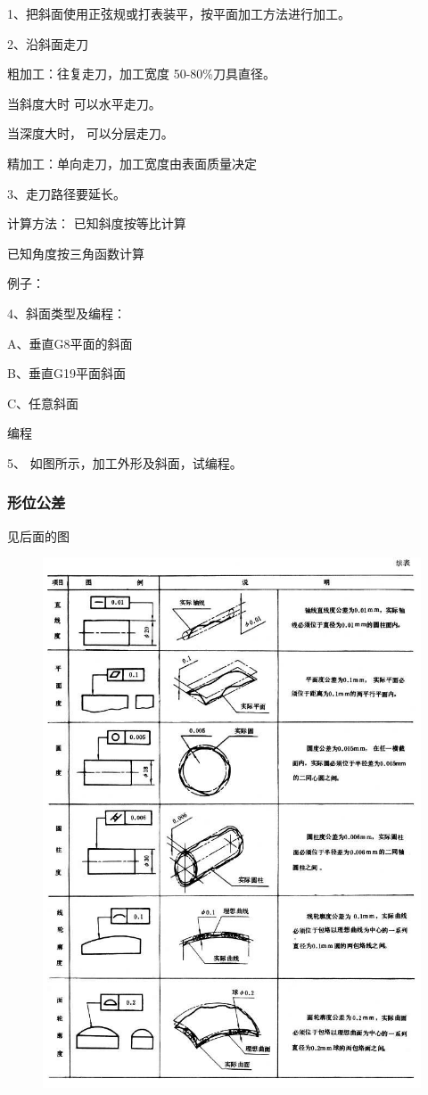 1、把斜面使用正弦规或打表装平，按平面加工方法进行加工。

2、沿斜面走刀

粗加工：往复走刀，加工宽度 50-80\%刀具直径。

当斜度大时 可以水平走刀。

当深度大时， 可以分层走刀。

精加工：单向走刀，加工宽度由表面质量决定

3、走刀路径要延长。

计算方法： 已知斜度按等比计算

已知角度按三角函数计算

例子：

4、斜面类型及编程：

A、垂直G8平面的斜面

B、垂直G19平面斜面

C、任意斜面

编程

5、  
如图所示，加工外形及斜面，试编程。

\subsubsection{形位公差}
见后面的图

\begin{figure}[h]
	\centering
	\includegraphics[width=0.9\linewidth]{data/image/13-1}
	\caption{}
\end{figure}

